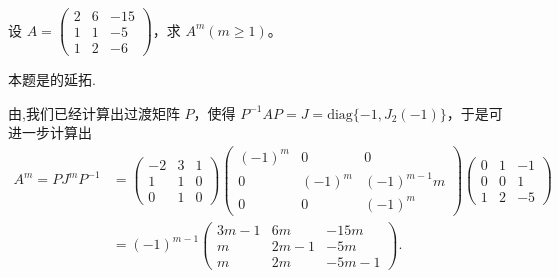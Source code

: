 \documentclass[../../main.tex]{subfiles}
\begin{document}
\begin{example}
设 $A = \begin{pmatrix}
2 & 6 & -15 \\
1 & 1 & -5 \\
1 & 2 & -6
\end{pmatrix}$，求 $A^m (m \geq 1)$。
\end{example}
\begin{remark}
本题是的延拓.
\end{remark}
\begin{solution}
由,我们已经计算出过渡矩阵 $P$，使得 $P^{-1}AP = J = \mathrm{diag}\{-1, J_2(-1)\}$，于是可进一步计算出
\begin{align*}
A^m = PJ^mP^{-1} &= \begin{pmatrix}
-2 & 3 & 1 \\
1 & 1 & 0 \\
0 & 1 & 0
\end{pmatrix}
\begin{pmatrix}
(-1)^m & 0 & 0 \\
0 & (-1)^m & (-1)^{m - 1}m \\
0 & 0 & (-1)^m
\end{pmatrix}
\begin{pmatrix}
0 & 1 & -1 \\
0 & 0 & 1 \\
1 & 2 & -5
\end{pmatrix}\\
&= (-1)^{m - 1}
\begin{pmatrix}
3m - 1 & 6m & -15m \\
m & 2m - 1 & -5m \\
m & 2m & -5m - 1
\end{pmatrix}. 
\end{align*}
\end{solution}
\end{document}
